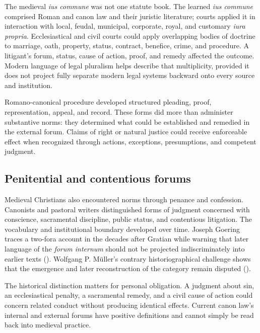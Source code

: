 The medieval \emph{ius commune} was not one statute book. The learned \emph{ius commune} comprised Roman and canon law and their juristic literature; courts applied it in interaction with local, feudal, municipal, corporate, royal, and customary \emph{iura propria}. Ecclesiastical and civil courts could apply overlapping bodies of doctrine to marriage, oath, property, status, contract, benefice, crime, and procedure. A litigant's forum, status, cause of action, proof, and remedy affected the outcome. Modern language of legal pluralism helps describe that multiplicity, provided it does not project fully separate modern legal systems backward onto every source and institution.

Romano-canonical procedure developed structured pleading, proof, representation, appeal, and record. These forms did more than administer substantive norms: they determined what could be established and remedied in the external forum. Claims of right or natural justice could receive enforceable effect when recognized through actions, exceptions, presumptions, and competent judgment.

\subsection{Penitential and contentious forums}

Medieval Christians also encountered norms through penance and confession. Canonists and pastoral writers distinguished forms of judgment concerned with conscience, sacramental discipline, public status, and contentious litigation. The vocabulary and institutional boundary developed over time. Joseph Goering traces a two-fora account in the decades after Gratian while warning that later language of the \emph{forum internum} should not be projected indiscriminately into earlier texts (). Wolfgang P. Müller's contrary historiographical challenge shows that the emergence and later reconstruction of the category remain disputed ().

The historical distinction matters for personal obligation. A judgment about sin, an ecclesiastical penalty, a sacramental remedy, and a civil cause of action could concern related conduct without producing identical effects. Current canon law's internal and external forums have positive definitions and cannot simply be read back into medieval practice.

